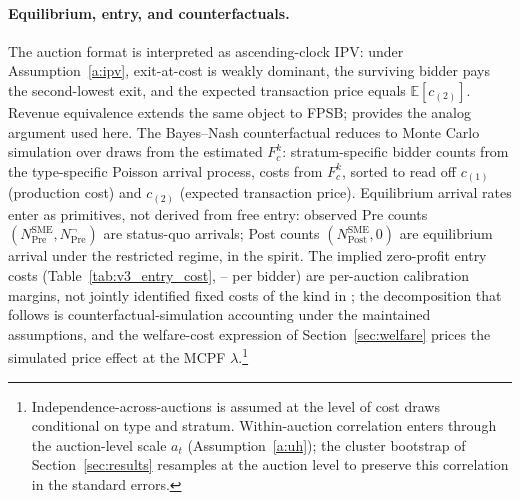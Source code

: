 \paragraph{Equilibrium, entry, and counterfactuals.} The auction format is interpreted as ascending-clock IPV: under Assumption~\ref{a:ipv}, exit-at-cost is weakly dominant, the surviving bidder pays the second-lowest exit, and the expected transaction price equals $\mathbb{E}[c_{(2)}]$. Revenue equivalence \citep{vickrey1961, maskinriley2000} extends the same object to FPSB; \citet{krasnokutskaya2011} provides the analog argument used here. The Bayes--Nash counterfactual reduces to Monte Carlo simulation over draws from the estimated $F_c^k$: stratum-specific bidder counts from the type-specific Poisson arrival process, costs from $F_c^k$, sorted to read off $c_{(1)}$ (production cost) and $c_{(2)}$ (expected transaction price). Equilibrium arrival rates enter as primitives, not derived from free entry: observed Pre counts $(N^{\text{SME}}_{\text{Pre}}, N^{\neg}_{\text{Pre}})$ are status-quo arrivals; Post counts $(N^{\text{SME}}_{\text{Post}}, 0)$ are equilibrium arrival under the restricted regime, in the \citet{atheyseira2011} spirit. The implied zero-profit entry costs (Table~\ref{tab:v3_entry_cost}, \entryCostMin--\entryCostMax{} per bidder) are per-auction calibration margins, not jointly identified fixed costs of the kind in \citet{krasnokutskayaseim2011}; the decomposition that follows is counterfactual-simulation accounting under the maintained assumptions, and the welfare-cost expression of Section~\ref{sec:welfare} prices the simulated price effect at the MCPF $\lambda$.\footnote{Independence-across-auctions is assumed at the level of cost draws conditional on type and stratum. Within-auction correlation enters through the auction-level scale $a_t$ (Assumption~\ref{a:uh}); the cluster bootstrap of Section~\ref{sec:results} resamples at the auction level to preserve this correlation in the standard errors.}

